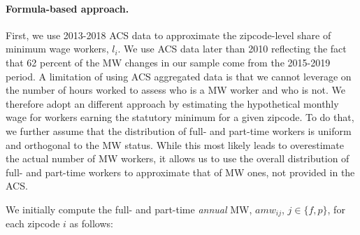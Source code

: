 
\paragraph{Formula-based approach.}
First, we use 2013-2018 ACS data to approximate the zipcode-level share of minimum wage 
workers, $l_{i}$. We use ACS data later than 2010 reflecting the fact that 62 percent of the 
MW changes in our sample come from the 2015-2019 period. A limitation of using ACS 
aggregated data is that we cannot leverage on the number of hours worked to assess who is a 
MW worker and who is not. We therefore adopt an different approach by estimating the hypothetical 
monthly wage for workers earning the statutory minimum for a given zipcode. To do that, 
we further assume that the distribution of full- and part-time workers is uniform and orthogonal 
to the MW status. While this most likely leads to overestimate the actual number of MW workers, 
it allows us to use the overall distribution of full- and part-time workers to 
approximate that of MW ones, not provided in the ACS. 

We initially compute the full- and part-time \textit{annual} MW, $amw_{ij}$, $j\in \{f, p\}$, 
for each zipcode $i$ as follows: 

